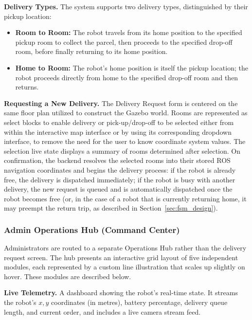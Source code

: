 \textbf{Delivery Types.} The system supports two delivery types, distinguished by their pickup location:
\begin{itemize}[noitemsep]
	\item \textbf{Room to Room:} The robot travels from its home position to the specified pickup room to collect the parcel, then proceeds to the specified drop-off room, before finally returning to its home position.
	\item \textbf{Home to Room:} The robot's home position is itself the pickup location; the robot proceeds directly from home to the specified drop-off room and then returns.
\end{itemize}

\textbf{Requesting a New Delivery.} The Delivery Request form is centered on the same floor plan utilized to construct the Gazebo world. Rooms are represented as select blocks to enable delivery or pick-up/drop-off to be selected either from within the interactive map interface or by using its corresponding dropdown interface, to remove the need for the user to know coordinate system values. The selection live state displays a summary of rooms determined after selection. On confirmation, the backend resolves the selected rooms into their stored ROS navigation coordinates and begins the delivery process: if the robot is already free, the delivery is dispatched immediately; if the robot is busy with another delivery, the new request is queued and is automatically dispatched once the robot becomes free (or, in the case of a robot that is currently returning home, it may preempt the return trip, as described in Section~\ref{sec:fsm_design}).

\subsubsection{Admin Operations Hub (Command Center)}
\label{sec:admin_hub}

Administrators are routed to a separate Operations Hub rather than the delivery request screen. The hub presents an interactive grid layout of five independent modules, each represented by a custom line illustration that scales up slightly on hover. These modules are described below.

\textbf{Live Telemetry.} A dashboard showing the robot's real-time state. It streams the robot's $x, y$ coordinates (in metres), battery percentage, delivery queue length, and current order, and includes a live camera stream feed.

